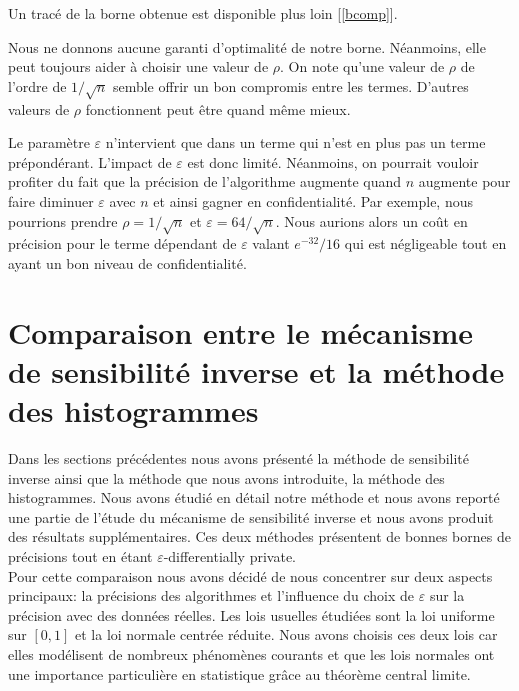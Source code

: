 Un tracé de la borne obtenue est disponible plus loin [\ref{bcomp}].

\begin{remark}
    Nous ne donnons aucune garanti d'optimalité de notre borne. Néanmoins, elle peut toujours aider à choisir une valeur de \(\rho\). On note qu'une valeur de \(\rho\) de l'ordre de \(1/\sqrt n\) semble offrir un bon compromis entre les termes. D'autres valeurs de \(\rho\) fonctionnent peut être quand même mieux.
\end{remark}

\begin{remark}
    Le paramètre \(\varepsilon\) n'intervient que dans un terme qui n'est en plus pas un terme prépondérant. L'impact de \(\varepsilon\) est donc limité. Néanmoins, on pourrait vouloir profiter du fait que la précision de l'algorithme augmente quand \(n\) augmente pour faire diminuer \(\varepsilon\) avec \(n\) et ainsi gagner en confidentialité. Par exemple, nous pourrions prendre \(\rho = 1/\sqrt n\) et \(\varepsilon = 64/\sqrt n\). Nous aurions alors un coût en précision pour le terme dépendant de \(\varepsilon\) valant \(e^{-32}/16\) qui est négligeable tout en ayant un bon niveau de confidentialité. 
\end{remark}

\section{Comparaison entre le mécanisme de sensibilité inverse et la méthode des histogrammes}


Dans les sections précédentes nous avons présenté la méthode de sensibilité inverse ainsi que la méthode que nous avons introduite, la méthode des histogrammes. Nous avons étudié en détail notre méthode et nous avons reporté une partie de l'étude du mécanisme de sensibilité inverse et nous avons produit des résultats supplémentaires. Ces deux méthodes présentent de bonnes bornes de précisions tout en étant \(\varepsilon\)-differentially private.\\

Pour cette comparaison nous avons décidé de nous concentrer sur deux aspects principaux: la précisions des algorithmes et l'influence du choix de \(\varepsilon\) sur la précision avec des données réelles. Les lois usuelles étudiées sont la loi uniforme sur \([0,1]\) et la loi normale centrée réduite. Nous avons choisis ces deux lois car elles modélisent de nombreux phénomènes courants et que les lois normales ont une importance particulière en statistique grâce au théorème central limite.\\

